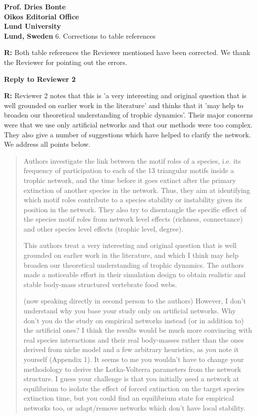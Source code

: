 \documentclass[12pt]{letter}
\begin{document}
\begin{letter}{\bf Prof. Dries Bonte\\
Oikos Editorial Office \\
Lund University \\
Lund, Sweden}
  6. Corrections to table references 
  

    \textbf{R:} Both table references the Reviewer mentioned have been corrected. We thank the Reviewer for pointing out the errors.


\clearpage

{\large\textbf{Reply to Reviewer 2}}

\textbf{R:} Reviewer 2 notes that this is 'a very interesting and original question that is well grounded on earlier work in the literature' and thinks that it 'may help to broaden our theoretical understanding of trophic dynamics'. Their major concerns were that we use only artificial networks and that our methods were too complex. They also give a number of suggestions which have helped to clarify the network. We address all points below.

  \begin{quotation}
  Authors investigate the link between the motif roles of a species, i.e. its frequency of participation to each of the 13 triangular motifs inside a trophic network, and the time before it goes extinct after the primary extinction of another species in the network. Thus, they aim at identifying which motif roles contribute to a species stability or instability given its position in the network. They also try to disentangle the specific effect of the species motif roles from network level effects (richness, connectance) and other species level effects (trophic level, degree).


  This authors treat a very interesting and original question that is well grounded on earlier work in the literature, and which I think may help broaden our theoretical understanding of trophic dynamics. The authors made a noticeable effort in their simulation design to obtain realistic and stable body-mass structured vertebrate food webs.


  (now speaking directly in second person to the authors) However, I don’t understand why you base your study only on artificial networks. Why don’t you do the study on empirical networks instead (or in addition to) the artificial ones? I think the results would be much more convincing with real species interactions and their real body-masses rather than the ones derived from niche model and a few arbitrary heuristics, as you note it yourself (Appendix 1). It seems to me you wouldn’t have to change your methodology to derive the Lotka-Volterra parameters from the network structure. I guess your challenge is that you initially need a network at equilibrium to isolate the effect of forced extinction on the target species extinction time, but you could find an equilibrium state for empirical networks too, or adapt/remove networks which don’t have local stability.
  \end{quotation}



\end{letter}
\end{document}
